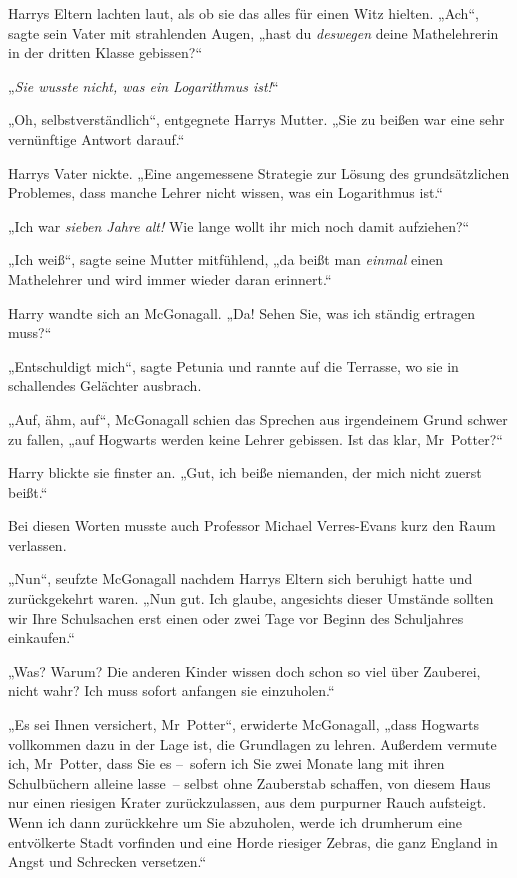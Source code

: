 {Harrys Eltern lachten laut, als ob sie das alles für einen Witz hielten. „Ach“, sagte sein Vater mit strahlenden Augen, „hast du \emph{deswegen} deine Mathelehrerin in der dritten Klasse gebissen?“

„\emph{Sie wusste nicht, was ein Logarithmus ist!}“

„Oh, selbstverständlich“, entgegnete Harrys Mutter. „Sie zu beißen war eine sehr vernünftige Antwort darauf.“

Harrys Vater nickte. „Eine angemessene Strategie zur Lösung des grundsätzlichen Problemes, dass manche Lehrer nicht wissen, was ein Logarithmus ist.“

„Ich war \emph{sieben Jahre alt!} Wie lange wollt ihr mich noch damit aufziehen?“

„Ich weiß“, sagte seine Mutter mitfühlend, „da beißt man \emph{einmal} einen Mathelehrer und wird immer wieder daran erinnert.“

Harry wandte sich an McGonagall. „Da! Sehen Sie, was ich ständig ertragen muss?“

„Entschuldigt mich“, sagte Petunia und rannte auf die Terrasse, wo sie in schallendes Gelächter ausbrach.

„Auf, ähm, auf“, McGonagall schien das Sprechen aus irgendeinem Grund schwer zu fallen, „auf Hogwarts werden keine Lehrer gebissen. Ist das klar, Mr~Potter?“

Harry blickte sie finster an. „Gut, ich beiße niemanden, der mich nicht zuerst beißt.“

Bei diesen Worten musste auch Professor Michael Verres-Evans kurz den Raum verlassen.

„Nun“, seufzte McGonagall nachdem Harrys Eltern sich beruhigt hatte und zurückgekehrt waren. „Nun gut. Ich glaube, angesichts dieser Umstände sollten wir Ihre Schulsachen erst einen oder zwei Tage vor Beginn des Schuljahres einkaufen.“

„Was? Warum? Die anderen Kinder wissen doch schon so viel über Zauberei, nicht wahr? Ich muss sofort anfangen sie einzuholen.“

„Es sei Ihnen versichert, Mr~Potter“, erwiderte McGonagall, „dass Hogwarts vollkommen dazu in der Lage ist, die Grundlagen zu lehren. Außerdem vermute ich, Mr~Potter, dass Sie es --~sofern ich Sie zwei Monate lang mit ihren Schulbüchern alleine lasse~-- selbst ohne Zauberstab schaffen, von diesem Haus nur einen riesigen Krater zurückzulassen, aus dem purpurner Rauch aufsteigt. Wenn ich dann zurückkehre um Sie abzuholen, werde ich drumherum eine entvölkerte Stadt vorfinden und eine Horde riesiger Zebras, die ganz England in Angst und Schrecken versetzen.“

}
